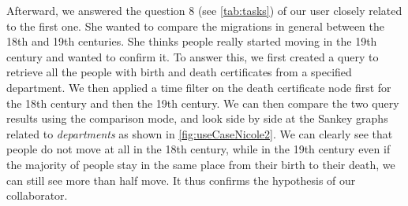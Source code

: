 Afterward, we answered the question 8 (see \autoref{tab:tasks}) of our user closely related to the first one. She wanted to compare the migrations in general between the 18th and 19th centuries. She thinks people really started moving in the 19th century and wanted to confirm it. To answer this, we first created a query to retrieve all the people with birth and death certificates from a specified department. We then applied a time filter on the death certificate node first for the 18th century and then the 19th century. We can then compare the two query results using the comparison mode, and look side by side at the Sankey graphs related to \textit{departments} as shown in \autoref{fig:useCaseNicole2}. We can clearly see that people do not move at all in the 18th century, while in the 19th century even if the majority of people stay in the same place from their birth to their death, we can still see more than half move. It thus confirms the hypothesis of our collaborator.

